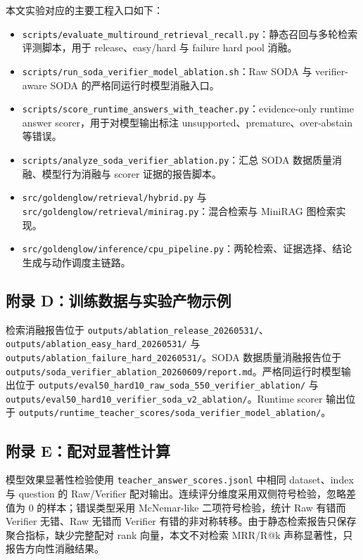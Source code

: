 \documentclass[UTF8,a4paper,12pt]{ctexart}
\newcommand{\code}[1]{\texttt{#1}}
\begin{document}
本文实验对应的主要工程入口如下：
\begin{itemize}
  \item \code{scripts/evaluate\_multiround\_retrieval\_recall.py}：静态召回与多轮检索评测脚本，用于 release、easy/hard 与 failure hard pool 消融。
  \item \code{scripts/run\_soda\_verifier\_model\_ablation.sh}：Raw SODA 与 verifier-aware SODA 的严格同运行时模型消融入口。
  \item \code{scripts/score\_runtime\_answers\_with\_teacher.py}：evidence-only runtime answer scorer，用于对模型输出标注 unsupported、premature、over-abstain 等错误。
  \item \code{scripts/analyze\_soda\_verifier\_ablation.py}：汇总 SODA 数据质量消融、模型行为消融与 scorer 证据的报告脚本。
  \item \code{src/goldenglow/retrieval/hybrid.py} 与 \code{src/goldenglow/retrieval/minirag.py}：混合检索与 MiniRAG 图检索实现。
  \item \code{src/goldenglow/inference/cpu\_pipeline.py}：两轮检索、证据选择、结论生成与动作调度主链路。
\end{itemize}

\subsection{附录 D：训练数据与实验产物示例}

检索消融报告位于 \code{outputs/ablation\_release\_20260531/}、\code{outputs/ablation\_easy\_hard\_20260531/} 与 \code{outputs/ablation\_failure\_hard\_20260531/}。SODA 数据质量消融报告位于 \code{outputs/soda\_verifier\_ablation\_20260609/report.md}。严格同运行时模型输出位于 \code{outputs/eval50\_hard10\_raw\_soda\_550\_verifier\_ablation/} 与 \code{outputs/eval50\_hard10\_verifier\_soda\_v2\_ablation/}。Runtime scorer 输出位于 \code{outputs/runtime\_teacher\_scores/soda\_verifier\_model\_ablation/}。

\subsection{附录 E：配对显著性计算}

模型效果显著性检验使用 \code{teacher\_answer\_scores.jsonl} 中相同 dataset、index 与 question 的 Raw/Verifier 配对输出。连续评分维度采用双侧符号检验，忽略差值为 0 的样本；错误类型采用 McNemar-like 二项符号检验，统计 Raw 有错而 Verifier 无错、Raw 无错而 Verifier 有错的非对称转移。由于静态检索报告只保存聚合指标，缺少完整配对 rank 向量，本文不对检索 MRR/R@k 声称显著性，只报告方向性消融结果。
\end{document}
